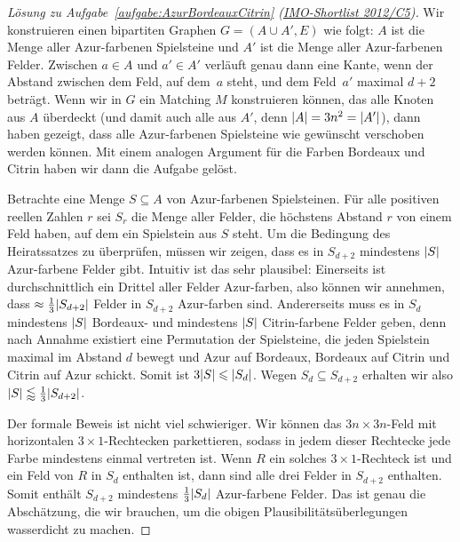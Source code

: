 \begin{proof}[Lösung zu Aufgabe~\ref{aufgabe:AzurBordeauxCitrin} \textmd{(\href{https://artofproblemsolving.com/community/c3963_2012_imo_shortlist}{IMO-Shortlist 2012/C5})}]
	Wir konstruieren einen bipartiten Graphen $G=(A\cup A',E)$ wie folgt: $A$ ist die Menge aller Azur-farbenen Spielsteine und $A'$ ist die Menge aller Azur-farbenen Felder. Zwischen $a\in A$ und $a'\in A'$ verläuft genau dann eine Kante, wenn der Abstand zwischen dem Feld, auf dem~$a$ steht, und dem Feld~$a'$ maximal $d+2$ beträgt. Wenn wir in $G$ ein Matching $M$ konstruieren können, das alle Knoten aus $A$ überdeckt (und damit auch alle aus $A'$, denn $\lvert A\rvert=3n^2=\lvert A'\rvert$), dann haben gezeigt, dass alle Azur-farbenen Spielsteine wie gewünscht verschoben werden können. Mit einem analogen Argument für die Farben Bordeaux und Citrin haben wir dann die Aufgabe gelöst.
	
	Betrachte eine Menge $S\subseteq A$ von Azur-farbenen Spielsteinen. Für alle positiven reellen Zahlen $r$ sei $S_r$ die Menge aller Felder, die höchstens Abstand $r$ von einem Feld haben, auf dem ein Spielstein aus $S$ steht. Um die Bedingung des Heiratssatzes zu überprüfen, müssen wir zeigen, dass es in $S_{d+2}$ mindestens $\lvert S\rvert$ Azur-farbene Felder gibt. Intuitiv ist das sehr plausibel: Einerseits ist durchschnittlich ein Drittel aller Felder Azur-farben, also können wir annehmen, dass $\approx\frac13\lvert S_{d+2}\rvert$ Felder in $S_{d+2}$ Azur-farben sind. Andererseits muss es in $S_d$ mindestens $\lvert S\rvert$ Bordeaux- und mindestens $\lvert S\rvert$ Citrin-farbene Felder geben, denn nach Annahme existiert eine Permutation der Spielsteine, die jeden Spielstein maximal im Abstand $d$ bewegt und Azur auf Bordeaux, Bordeaux auf Citrin und Citrin auf Azur schickt. Somit ist $3\lvert S\rvert\leqslant \lvert S_d\rvert$. Wegen $S_d\subseteq S_{d+2}$ erhalten wir also $\lvert S\rvert\lessapprox \frac13\lvert S_{d+2}\rvert$.
	
	Der formale Beweis ist nicht viel schwieriger. Wir können das $3n\times 3n$-Feld mit horizontalen $3\times 1$-Rechtecken parkettieren, sodass in jedem dieser Rechtecke jede Farbe mindestens einmal vertreten ist. Wenn $R$ ein solches $3\times 1$-Rechteck ist und ein Feld von $R$ in $S_d$ enthalten ist, dann sind alle drei Felder in $S_{d+2}$ enthalten. Somit enthält $S_{d+2}$ mindestens $\frac13\lvert S_d\rvert$ Azur-farbene Felder. Das ist genau die Abschätzung, die wir brauchen, um die obigen Plausibilitätsüberlegungen wasserdicht zu machen.
\end{proof}